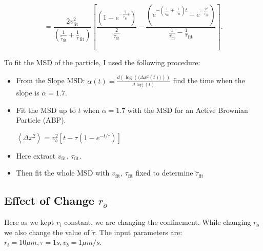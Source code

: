 \documentclass[%
10pt,
superscriptaddress,
twocolumn,
 amsmath,amssymb,
 aps,prx,
]{revtex4-2}
\begin{document}
\begin{equation}
	\label{MSD_fit}
	=\frac{2v_{\text{fit}}^2}{(\frac{1}{\tilde{\tau}_{\text{fit}}}+\frac{1}{\tau}_{\text{fit}})}\left[\frac{(1-e^{-\frac{2}{\tilde{\tau}_{\text{fit}}} t})}{\frac{2}{\tilde{\tau}_{\text{fit}}}}-\frac{(e^{-(\frac{1}{\tilde{\tau_{\text{fit}}}}+\frac{1}{\tau_{\text{fit}}})t}-e^{-\frac{2t}{\tilde{\tau}_{\text{fit}}} })}{\frac{1}{\tilde{\tau_{\text{fit}}}}-\frac{1}{\tau}_{\text{fit}}}\right].
\end{equation}

To fit the MSD of the particle, I used the following procedure:
\begin{itemize}
\item From the Slope MSD: $\alpha(t) = \frac{d(\log(\langle \Delta x^2 (t)\rangle))}{d\log(t)}$ find the time when the slope is $\alpha = 1.7$. 
\item Fit the MSD up to $t$ when $\alpha = 1.7$ with the MSD for an Active Brownian Particle (ABP). 

$\left<\Delta x^2\right>= v_b^2\left[t-\tau(1-e^{-t/\tau})\right]$
\item Here extract $v_{\text{fit}}$, $\tau_{\text{fit}}$.
\item Then fit the whole MSD with $v_{\text{fit}}$, $\tau_{\text{fit}}$ fixed to determine $\tilde{\tau}_\text{fit}$
\end{itemize}


\subsection{Effect of Change $r_o$}
Here as we kept $r_i$ constant, we are changing the confinement. While changing $r_o$ we also change the value of $\tilde{\tau}$. The input parameters are: $r_i = 10 \mu m, \tau =1 s, v_b =1 \mu m/s$. 
\end{document}
